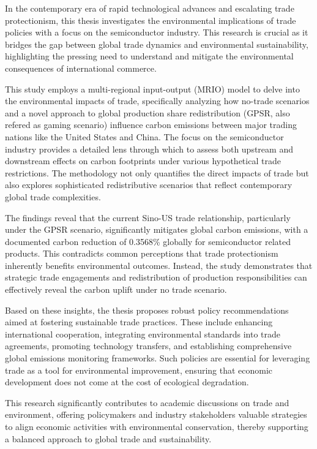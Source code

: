 \begin{abstractEn}
    In the contemporary era of rapid technological advances and escalating trade protectionism, this thesis investigates the environmental implications of trade policies with a focus on the semiconductor industry. This research is crucial as it bridges the gap between global trade dynamics and environmental sustainability, highlighting the pressing need to understand and mitigate the environmental consequences of international commerce.

    This study employs a multi-regional input-output (MRIO) model to delve into the environmental impacts of trade, specifically analyzing how no-trade scenarios and a novel approach to global production share redistribution (GPSR, also refered as gaming scenario) influence carbon emissions between major trading nations like the United States and China. The focus on the semiconductor industry provides a detailed lens through which to assess both upstream and downstream effects on carbon footprints under various hypothetical trade restrictions. The methodology not only quantifies the direct impacts of trade but also explores sophisticated redistributive scenarios that reflect contemporary global trade complexities.

    The findings reveal that the current Sino-US trade relationship, particularly under the GPSR scenario, significantly mitigates global carbon emissions, with a documented carbon reduction of 0.3568\% globally for semiconductor related products. This contradicts common perceptions that trade protectionism inherently benefits environmental outcomes. Instead, the study demonstrates that strategic trade engagements and redistribution of production responsibilities can effectively reveal the carbon uplift under no trade scenario.

    Based on these insights, the thesis proposes robust policy recommendations aimed at fostering sustainable trade practices. These include enhancing international cooperation, integrating environmental standards into trade agreements, promoting technology transfers, and establishing comprehensive global emissions monitoring frameworks. Such policies are essential for leveraging trade as a tool for environmental improvement, ensuring that economic development does not come at the cost of ecological degradation.

    This research significantly contributes to academic discussions on trade and environment, offering policymakers and industry stakeholders valuable strategies to align economic activities with environmental conservation, thereby supporting a balanced approach to global trade and sustainability.

\end{abstractEn}

